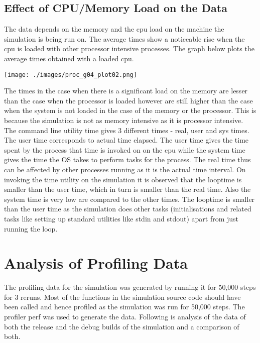 \documentclass[11pt]{article}
\begin{document}
\subsection{Effect of CPU/Memory Load on the Data}
\indent The data depends on the memory and the cpu load on the machine the simulation is being run on. The average times show a noticeable rise when the cpu is loaded with other processor intensive processes. The graph below plots the average times obtained with a loaded cpu. 
\\
\begin{center}
	\texttt{[image: ./images/proc\_g04\_plot02.png]}
\end{center}
The times in the case when there is a significant load on the memory are lesser than the case when the processor is loaded however are still higher than the case when the system is not loaded in the case of the memory or the processor. This is because the simulation is not as memory intensive as it is processor intensive.
\\
\indent The command line utility time gives 3 different times - real, user and sys times. The user time corresponds to actual time elapsed. The user time gives the time spent by the process that time is invoked on on the cpu while the system time gives the time the OS takes to perform tasks for the process. The real time thus can be affected by other processes running as it is the actual time interval. On invoking the time utility on the simulation it is observed that the looptime is smaller than the user time, which in turn is smaller than the real time. Also the system time is very low are compared to the other times. The looptime is smaller than the user time as the simulation does other tasks (initialisations and related tasks like setting up standard utilities like stdin and stdout)\cite{startOfCppprog} apart from just running the loop.


\section{Analysis of Profiling Data}
The profiling data for the simulation was generated by running it for 50,000 steps for 3 reruns. Most of the functions in the simulation source code should have been called and hence profiled as the simulation was run for 50,000 steps. The profiler perf\cite{perfsite} was used to generate the data. Following is analysis of the data of both the release and the debug builds of the simulation and a comparison of both.
\end{document}
